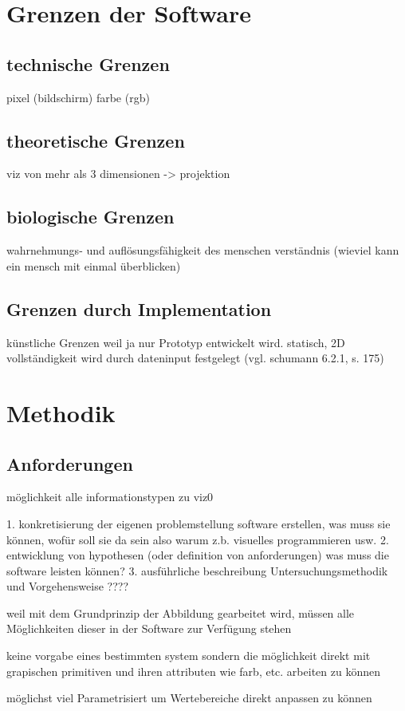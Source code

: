 \documentclass[a4paper, 12pt, onepage, pdftex, headsepline, footsepline]{scrreprt}
\begin{document}
\chapter{Grenzen der Software}
\section{technische Grenzen}
pixel (bildschirm)
farbe (rgb)
\section{theoretische Grenzen}
viz von mehr als 3 dimensionen -> projektion
\section{biologische Grenzen}
wahrnehmungs- und auflösungsfähigkeit des menschen
verständnis (wieviel kann ein mensch mit einmal überblicken)
\section{Grenzen durch Implementation}
künstliche Grenzen weil ja nur Prototyp entwickelt wird.
statisch, 2D vollständigkeit wird durch dateninput festgelegt (vgl. schumann 6.2.1, s. 175)


\chapter{Methodik}
\section{Anforderungen}
möglichkeit alle informationstypen zu viz0

1. konkretisierung der eigenen problemstellung
software erstellen, was muss sie können, wofür soll sie da sein
also warum z.b. visuelles programmieren usw.
2. entwicklung von hypothesen (oder definition von anforderungen)
was muss die software leisten können?
3. ausführliche beschreibung Untersuchungsmethodik und Vorgehensweise
????

weil mit dem Grundprinzip der Abbildung gearbeitet wird, müssen alle Möglichkeiten dieser in der Software zur Verfügung stehen

keine vorgabe eines bestimmten system sondern die möglichkeit direkt mit grapischen primitiven und ihren attributen wie farb, etc. arbeiten zu können

möglichst viel Parametrisiert um Wertebereiche direkt anpassen zu können
\end{document}
